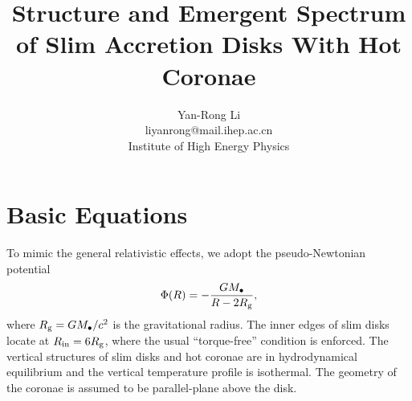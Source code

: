\documentclass[oneside]{book}
\begin{document}
\title{Structure and Emergent Spectrum of Slim Accretion Disks With Hot Coronae}
\author{Yan-Rong Li\\
liyanrong@mail.ihep.ac.cn\\
Institute of High Energy Physics}
\date{}
\maketitle

\chapter{Basic Equations}
To mimic the general relativistic effects, we adopt the pseudo-Newtonian potential
\begin{equation}
\Phi(R)=-\frac{GM_\bullet}{R-2R_{\rm g}},
\end{equation}
where $R_{\rm g}=GM_\bullet/c^2$ is the gravitational radius. The inner edges of slim disks locate at 
$R_{\rm in}=6R_{\rm g}$, where the usual ``torque-free'' condition is enforced. The vertical structures of slim disks
and hot coronae are in hydrodynamical equilibrium and the vertical temperature profile is isothermal.
The geometry of the coronae is assumed to be parallel-plane above the disk.
\end{document}
